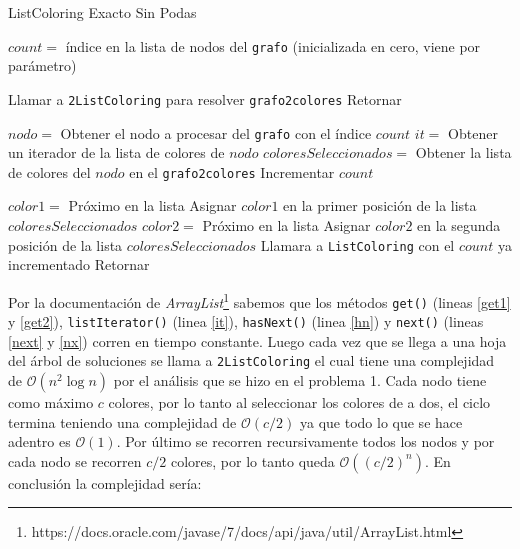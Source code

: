 \begin{algorithm}[H]
\caption{ListColoring Exacto Sin Podas}
\label{lce}
\begin{algorithmic}[1] 

\STATE $count = $ índice en la lista de nodos del \texttt{grafo} (inicializada en cero, viene por parámetro)

	\STATE Llamar a \texttt{2ListColoring} para resolver \texttt{grafo2colores}  %
	\STATE Retornar 
\ENDIF

\STATE $nodo = $ Obtener el nodo a procesar del \texttt{grafo} con el índice $count$  \label{get1}
\STATE $it = $ Obtener un iterador de la lista de colores de $nodo$  \label{it}
\STATE $coloresSeleccionados = $ Obtener la lista de colores del $nodo$ en el \texttt{grafo2colores}  \label{get2}
\STATE Incrementar $count$ 

 \label{hn}
	\STATE $color1 = $ Próximo en la lista  \label{next}
	\STATE Asignar $color1$ en la primer posición de la lista $coloresSeleccionados$ 
		\STATE $color2 = $ Próximo en la lista  \label{nx}
		\STATE Asignar $color2$ en la segunda posición de la lista $coloresSeleccionados$ 
	\ENDIF
	\STATE Llamara a \texttt{ListColoring} con el $count$ ya incrementado
\ENDWHILE
\STATE Retornar
\end{algorithmic}
\end{algorithm}
\leavevmode
\newline
Por la documentación de \emph{ArrayList}\footnote{https://docs.oracle.com/javase/7/docs/api/java/util/ArrayList.html} sabemos que los métodos \texttt{get()} (lineas \ref{get1} y \ref{get2}), \texttt{listIterator()} (linea \ref{it}), \texttt{hasNext()} (linea \ref{hn}) y \texttt{next()} (lineas \ref{next} y \ref{nx}) corren en tiempo constante. Luego cada vez que se llega a una hoja del árbol de soluciones se llama a \texttt{2ListColoring} el cual tiene una complejidad de $\mathcal{O}(n^2 \log{n})$ por el análisis que se hizo en el problema 1. Cada nodo tiene como máximo $c$ colores, por lo tanto al seleccionar los colores de a dos, el ciclo termina teniendo una complejidad de $\mathcal{O}(c/2)$ ya que todo lo que se hace adentro es $\mathcal{O}(1)$. Por último se recorren recursivamente todos los nodos y por cada nodo se recorren $c/2$ colores, por lo tanto queda $\mathcal{O}((c/2)^n)$. En conclusión la complejidad sería:

